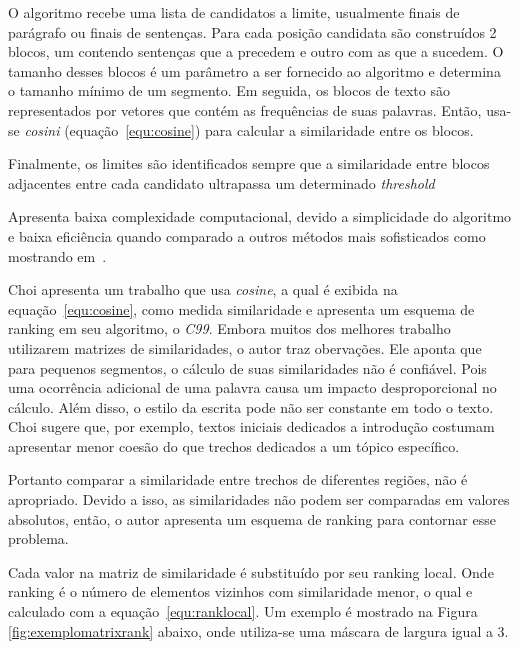 O algoritmo recebe uma lista de candidatos a limite, usualmente finais de parágrafo ou finais de sentenças. Para cada posição candidata são construídos 2 blocos, um contendo sentenças que a precedem e outro com as que a sucedem. O tamanho desses blocos é um parâmetro a ser fornecido ao algoritmo e determina o tamanho mínimo de um segmento.
%
Em seguida, os blocos de texto são representados por vetores que contém as frequências de suas palavras. Então, usa-se \textit{cosini} (equação~\ref{equ:cosine}) para calcular a similaridade entre os blocos.

Finalmente, os limites são identificados sempre que a similaridade entre blocos adjacentes entre cada candidato ultrapassa um determinado \textit{threshold}

Apresenta baixa complexidade computacional, devido a simplicidade do algoritmo e baixa eficiência quando comparado a outros métodos mais sofisticados como mostrando em~\cite{Choi2000, Kern2009167}.








Choi \cite{Choi2000} apresenta um trabalho que usa \textit{cosine}, a qual é exibida na equação~\ref{equ:cosine}, como medida similaridade e apresenta um esquema de ranking em seu algoritmo, o \textit{C99}. 
%
Embora muitos dos melhores trabalho utilizarem matrizes de similaridades, o autor traz obervações.
%
Ele aponta que para pequenos segmentos, o cálculo de suas similaridades não é confiável. Pois uma ocorrência adicional de uma palavra causa um impacto desproporcional no cálculo.
%
Além disso, o estilo da escrita pode não ser constante em todo o texto. Choi sugere que, por exemplo, textos iniciais dedicados a introdução costumam apresentar menor coesão do que trechos dedicados a um tópico específico. 
%

Portanto comparar a similaridade entre trechos de diferentes regiões, não é apropriado.
Devido a isso, as similaridades não podem ser comparadas em valores absolutos,  então, o autor apresenta um esquema de ranking para contornar esse problema.
%



Cada valor na matriz de similaridade é substituído por seu ranking local. Onde ranking é o número de elementos vizinhos com similaridade menor, o qual e calculado com a equação~\ref{equ:ranklocal}. Um exemplo é mostrado na Figura \ref{fig:exemplomatrixrank} abaixo, onde utiliza-se uma máscara de largura igual a 3.



